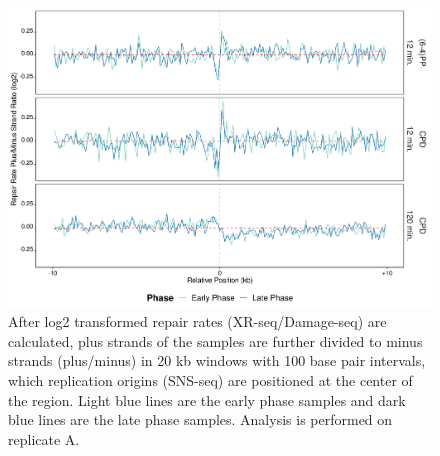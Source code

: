 \begin{figure}[H]
    \begin{center}
    \includegraphics[width=\textwidth]{Chapters/7_appendix/figures/supfig60}
    \caption[Repair rate plus/minus ratio of replication origins in 20 kb (replicate A).]{After log2 transformed repair rates (XR-seq/Damage-seq) are calculated, plus strands of the samples are further divided to minus strands (plus/minus) in 20 kb windows with 100 base pair intervals, which replication origins (SNS-seq) are positioned at the center of the region. Light blue lines are the early phase samples and dark blue lines are the late phase samples. Analysis is performed on replicate A.}
    \label{supfig:rrpm20snsA}
    \end{center}
    \end{figure}

